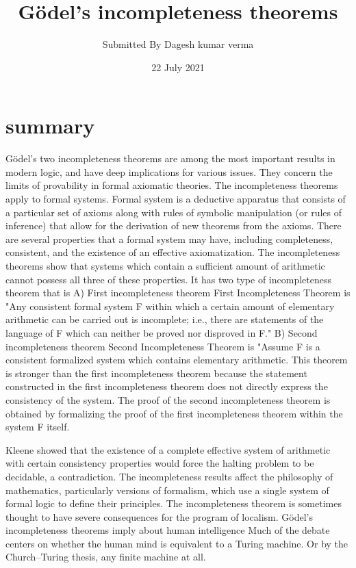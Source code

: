 \documentclass{article}\usepackage[utf8]{inputenc} \title{Gödel's incompleteness theorems}
\author{Submitted By Dagesh kumar verma}
\date{22 July 2021}
\begin{document}
 
\maketitle 
\section{summary}Gödel’s two incompleteness theorems are among the most important results in modern logic, and have deep implications for various issues. They concern the limits of provability in formal axiomatic theories. The incompleteness theorems apply to formal systems. Formal system is a deductive apparatus that consists of a particular set of axioms along with rules of symbolic manipulation (or rules of inference) that allow for the derivation of new theorems from the axioms. There are several properties that a formal system may have, including completeness, consistent, and the existence of an effective axiomatization. The incompleteness theorems show that systems which contain a sufficient amount of arithmetic cannot possess all three of these properties. It has two type of incompleteness theorem that is A) First incompleteness theorem First Incompleteness Theorem is "Any consistent formal system F within which a certain amount of elementary arithmetic can be carried out is incomplete; i.e., there are statements of the language of F which can neither be proved nor disproved in F." B) Second incompleteness theorem Second Incompleteness Theorem is "Assume F is a consistent formalized system which contains elementary arithmetic. This theorem is stronger than the first incompleteness theorem because the statement constructed in the first incompleteness theorem does not directly express the consistency of the system. The proof of the second incompleteness theorem is obtained by formalizing the proof of the first incompleteness theorem within the system F itself. 

Kleene showed that the existence of a complete effective system of arithmetic with certain consistency properties would force the halting problem to be decidable, a contradiction. The incompleteness results affect the philosophy of mathematics, particularly versions of formalism, which use a single system of formal logic to define their principles. The incompleteness theorem is sometimes thought to have severe consequences for the program of localism. Gödel's incompleteness theorems imply about human intelligence Much of the debate centers on whether the human mind is equivalent to a Turing machine. Or by the Church–Turing thesis, any finite machine at all. 
\end{document}
